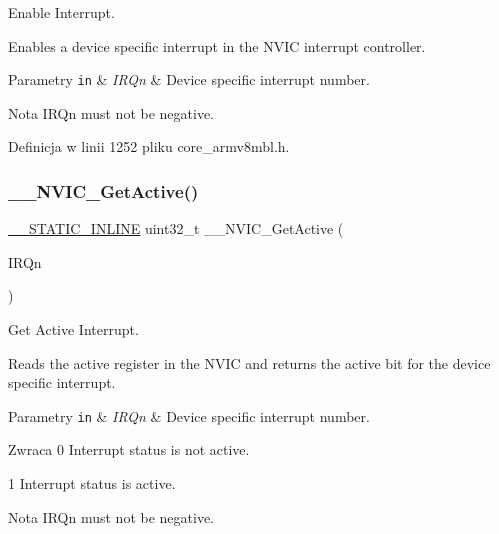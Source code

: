 Enable Interrupt. 

Enables a device specific interrupt in the N\+V\+IC interrupt controller. 
\begin{DoxyParams}[1]{Parametry}
\mbox{\tt in}  & {\em I\+R\+Qn} & Device specific interrupt number. \\
\hline
\end{DoxyParams}
\begin{DoxyNote}{Nota}
I\+R\+Qn must not be negative. 
\end{DoxyNote}


Definicja w linii 1252 pliku core\+\_\+armv8mbl.\+h.

\mbox{\label{group___c_m_s_i_s___core___n_v_i_c_functions_gaa2837003c28c45abf193fe5e8d27f593}} 
\subsubsection{\texorpdfstring{\+\_\+\+\_\+\+N\+V\+I\+C\+\_\+\+Get\+Active()}{\_\_NVIC\_GetActive()}}
{\footnotesize\ttfamily \hyperlink{cmsis__iccarm_8h_aba87361bfad2ae52cfe2f40c1a1dbf9c}{\+\_\+\+\_\+\+S\+T\+A\+T\+I\+C\+\_\+\+I\+N\+L\+I\+NE} uint32\+\_\+t \+\_\+\+\_\+\+N\+V\+I\+C\+\_\+\+Get\+Active (\begin{DoxyParamCaption}\item[{\hyperlink{group___peripheral__interrupt__number__definition_ga7e1129cd8a196f4284d41db3e82ad5c8}{I\+R\+Qn\+\_\+\+Type}}]{I\+R\+Qn }\end{DoxyParamCaption})}



Get Active Interrupt. 

Reads the active register in the N\+V\+IC and returns the active bit for the device specific interrupt. 
\begin{DoxyParams}[1]{Parametry}
\mbox{\tt in}  & {\em I\+R\+Qn} & Device specific interrupt number. \\
\hline
\end{DoxyParams}
\begin{DoxyReturn}{Zwraca}
0 Interrupt status is not active. 

1 Interrupt status is active. 
\end{DoxyReturn}
\begin{DoxyNote}{Nota}
I\+R\+Qn must not be negative. 
\end{DoxyNote}


